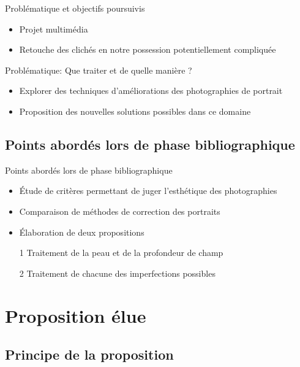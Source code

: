 \documentclass{beamer}
\begin{document}
\begin{frame}{Problématique et objectifs poursuivis}
\begin{itemize}
\item Projet multimédia
\item Retouche des clichés en notre possession potentiellement compliquée
\end{itemize}
\pause
\begin{block}{Problématique: }
Que traiter et de quelle manière ?
\end{block}
\pause
\begin{itemize}
\item Explorer des techniques d'améliorations des photographies de portrait
\item Proposition des nouvelles solutions possibles dans ce domaine
\end{itemize}
\end{frame}

\subsection{Points abordés lors de phase bibliographique}

\begin{frame}{Points abordés lors de phase bibliographique}
\begin{itemize}
\item Étude de critères permettant de juger l'esthétique des photographies
\item Comparaison de méthodes de correction des portraits 
\item Élaboration de deux propositions 
\item[1] Traitement de la peau et de la profondeur de champ
\item[2] Traitement de chacune des imperfections possibles
\end{itemize}
\end{frame}


\section{Proposition élue}

\subsection{Principe de la proposition}
\end{document}
